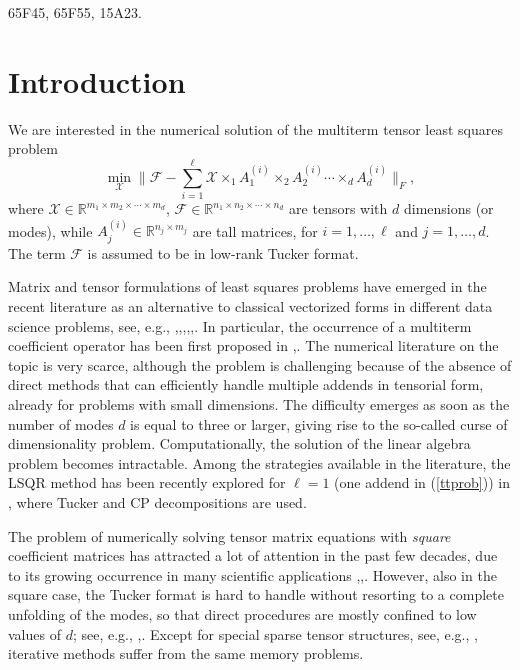 \documentclass{siamart190516}
\newcommand{\cc}[1]{\mathcal{#1}}
\newcommand{\bb}[1]{\mathbb{#1}}
\begin{document}
\begin{AMS}
    65F45, 65F55, 15A23.
\end{AMS}
    

\section{Introduction}\label{sec:intro}

We are interested in the numerical solution of the multiterm tensor least squares problem
\begin{equation}\label{ttprob}
    \min_{\cc{X}} \| \cc{F} - \sum_{i =1}^{\ell} \cc{X} \times_1 A_1^{(i)} \times_2 A_2^{(i)} \cdots \times_d A_d^{(i)} \|_F,
\end{equation}
where $\cc{X}\in\bb{R}^{m_1 \times m_2 \times \cdots \times m_d}$, $\cc{F}\in\bb{R}^{n_1\times n_2 \times \cdots \times n_d}$ are tensors with $d$ dimensions (or modes), while $A_j^{(i)}\in\bb{R}^{n_j \times m_j}$ are tall matrices, for  $i=1,\ldots,\ell$ and $j=1,\ldots,d$. The term $\cc{F}$ is assumed to be in
low-rank Tucker format.

Matrix and tensor formulations of least squares problems have emerged in the recent literature as an alternative to classical vectorized forms in different data science problems, see, e.g., \cite{Bouseeetal.17},\cite{Brandoni.Simoncini.20},\cite{Chang.Wu.24},\cite{Kernfeldetal.15},\cite{doi:10.1137/110842570},\cite{algarte2025}. In particular,  the occurrence of a multiterm coefficient operator has been first proposed in \cite{Dantas2019},\cite{Dantasetal2017}. The numerical literature on the topic is very scarce, although the problem is challenging because of the absence of direct methods that can efficiently handle multiple addends in tensorial form, already for problems with small dimensions. The difficulty emerges as soon as the number of modes $d$ is equal to three or larger, giving rise to the so-called curse of dimensionality problem. Computationally, the solution of the linear algebra problem becomes intractable. Among the strategies available in the literature,
the LSQR method has been recently explored for $\ell=1$ (one addend in
(\ref{ttprob})) in \cite{Bentbibetal.22}, where Tucker and CP decompositions are used.

The problem of numerically solving tensor matrix equations with {\it square} coefficient matrices has attracted a lot of attention
in the past few decades, due to its growing occurrence in many scientific applications \cite{Hackbusch.Khoro.Tyrty.05},\cite{Khoromoskij.12},\cite{Khoromskij.18}.
However, also in the square case, the Tucker format is hard to handle without resorting
to a complete unfolding of the modes, so that
direct procedures
are mostly confined to low values  of $d$; see, e.g., \cite{Chen.Kressner.20},\cite{Simoncini.00}.
Except for special sparse tensor structures, see, e.g.,
\cite{Kressner.Tobler.10}, iterative methods suffer from the same memory problems.
\end{document}
